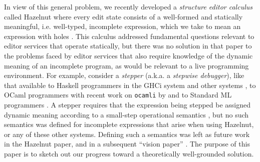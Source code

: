 In view of this general problem, we recently developed a \emph{structure editor calculus} called Hazelnut where every edit state consists of a well-formed and statically meaningful, i.e. well-typed, incomplete expression, which we take to mean an expression with holes \cite{popl-paper}. This calculus addressed fundamental questions relevant to editor services that operate statically, but there was no solution in that paper to the problems faced by editor services that also require knowledge of the dynamic meaning of an incomplete program, as would be relevant to a live programming environment. For example, consider a \emph{stepper} (a.k.a. a \emph{stepwise debugger}), like that available to Haskell programmers in the GHCi system \cite{GHC-stepper} and other systems \cite{DBLP:conf/haskell/MarlowIPG07,kar13566}, to OCaml programmers with recent work on \texttt{ocamli} by \citet{ocaml-stepper} and to Standard ML programmers \cite{DBLP:journals/jfp/TolmachA95}. A stepper requires that the expression being stepped be assigned dynamic meaning according to a small-step operational semantics \cite{DBLP:journals/jlp/Plotkin04a,pfpl}, but no such semantics was defined for incomplete expressions that arise when using Hazelnut, or any of these other systems. Defining such a semantics was left as future work in the Hazelnut paper, and in a subsequent ``vision paper'' \cite{snapl17-paper}. The purpose of this paper is to sketch out our progress toward a theoretically well-grounded solution.


